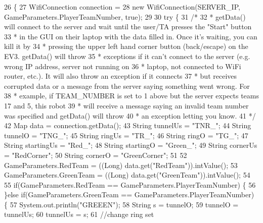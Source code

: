 \begin{DoxyCode}
26                                 \{
27     WifiConnection connection =
28         \textcolor{keyword}{new} WifiConnection(SERVER\_IP, GameParameters.PlayerTeamNumber, \textcolor{keyword}{true});
29 
30     \textcolor{keywordflow}{try} \{
31       \textcolor{comment}{/*}
32 \textcolor{comment}{       * getData() will connect to the server and wait until the user/TA presses the "Start" button}
33 \textcolor{comment}{       * in the GUI on their laptop with the data filled in. Once it's waiting, you can kill it by}
34 \textcolor{comment}{       * pressing the upper left hand corner button (back/escape) on the EV3. getData() will throw}
35 \textcolor{comment}{       * exceptions if it can't connect to the server (e.g. wrong IP address, server not running on}
36 \textcolor{comment}{       * laptop, not connected to WiFi router, etc.). It will also throw an exception if it connects}
37 \textcolor{comment}{       * but receives corrupted data or a message from the server saying something went wrong. For}
38 \textcolor{comment}{       * example, if TEAM\_NUMBER is set to 1 above but the server expects teams 17 and 5, this robot}
39 \textcolor{comment}{       * will receive a message saying an invalid team number was specified and getData() will throw}
40 \textcolor{comment}{       * an exception letting you know.}
41 \textcolor{comment}{       */}
42       Map data = connection.getData();
43       String tunnelUs = \textcolor{stringliteral}{"TNR\_"};
44       String tunnelO = \textcolor{stringliteral}{"TNG\_"};
45       String ringUs = \textcolor{stringliteral}{"TR\_"};
46       String ringO = \textcolor{stringliteral}{"TG\_"};
47       String startingUs = \textcolor{stringliteral}{"Red\_"};
48       String startingO = \textcolor{stringliteral}{"Green\_"};
49       String cornerUs = \textcolor{stringliteral}{"RedCorner"};
50       String cornerO = \textcolor{stringliteral}{"GreenCorner"};
51      
52       GameParameters.RedTeam = ((Long) data.get(\textcolor{stringliteral}{"RedTeam"})).intValue();
53       GameParameters.GreenTeam = ((Long) data.get(\textcolor{stringliteral}{"GreenTeam"})).intValue();
54 
55       \textcolor{keywordflow}{if}(GameParameters.RedTeam == GameParameters.PlayerTeamNumber) \{
56       \}\textcolor{keywordflow}{else} \textcolor{keywordflow}{if}(GameParameters.GreenTeam == GameParameters.PlayerTeamNumber) \{
57         System.out.println(\textcolor{stringliteral}{"GREEEN"});
58         String s = tunnelO;
59         tunnelO = tunnelUs;
60         tunnelUs = s;
61         \textcolor{comment}{//change ring set}

\end{DoxyCode}
